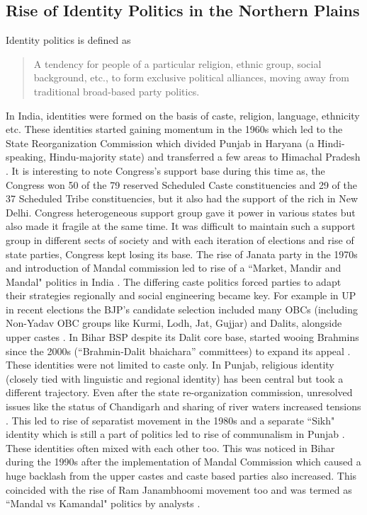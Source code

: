\begin{sloppypar}
\subsection{Rise of Identity Politics in the Northern Plains}
Identity politics is defined as \begin{quote}
     A tendency for people of a particular religion, ethnic group, social background, etc., to form exclusive political alliances, moving away from traditional broad-based party politics.
 \end{quote}  \citep{oed2024}
In India, identities were formed on the basis of caste, religion, language, ethnicity etc. These identities started gaining momentum in the 1960s which led to the State Reorganization Commission which divided Punjab in Haryana (a Hindi-speaking, Hindu-majority state) and transferred a few areas to Himachal Pradesh \citep{Punjab_1966_reorg}. It is interesting to note Congress's support base during this time as, the Congress won 50 of the 79 reserved Scheduled Caste constituencies and 29 of the 37 Scheduled Tribe constituencies, but it also had the support of the rich in New Delhi. Congress heterogeneous support group gave it power in various states but also made it fragile at the same time. It was difficult to maintain such a support group in different sects of society and with each iteration of elections and rise of state parties, Congress kept losing its base. The rise of Janata party in the 1970s and introduction of Mandal commission led to rise of a ``Market, Mandir and Mandal" politics in India \citep{yadav1999electoral}. The differing caste politics forced parties to adapt their strategies regionally and social engineering became key. For example in UP in recent elections the BJP’s candidate selection  included many OBCs (including Non-Yadav OBC groups like Kurmi, Lodh, Jat, Gujjar) and Dalits, alongside upper castes \citep{jaffrelot2012castes}. In Bihar BSP despite its Dalit core base, started wooing Brahmins since the 2000s (“Brahmin-Dalit bhaichara” committees) to expand its appeal \citep{ankit2018caste}. These identities were not limited to caste only. In Punjab, religious identity (closely tied with linguistic and regional identity) has been central but took a different trajectory. Even after the state re-organization commission,  unresolved issues like the status of Chandigarh and sharing of river waters increased tensions \citep{padhiari2008inter}. This led to rise of separatist movement in the 1980s and a separate ``Sikh" identity which is still a part of politics led to rise of communalism in Punjab \citep{gupta1985communalising}. These identities often mixed with each other too. This was noticed in Bihar during the 1990s after the implementation of Mandal Commission which caused a huge backlash from the upper castes and caste based parties also increased. This coincided with the rise of Ram Janambhoomi movement too and was termed as ``Mandal vs Kamandal" politics by analysts \citep{roy2024politics}. 


\end{sloppypar}
